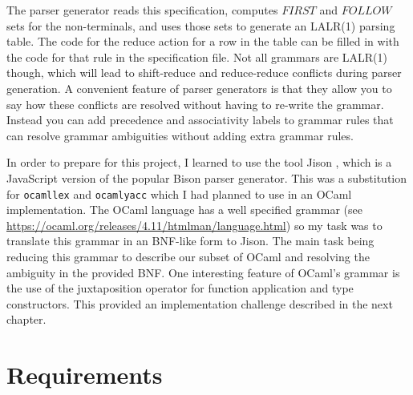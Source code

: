 \documentclass[12pt,a4paper,twoside,openright]{report}
\begin{document}
The parser generator reads this specification, computes $FIRST$ and $FOLLOW$ sets for the non-terminals, and uses those sets to generate an LALR(1) parsing table.
The code for the reduce action for a row in the table can be filled in with the code for that rule in the specification file.
Not all grammars are LALR(1) though, which will lead to shift-reduce and reduce-reduce conflicts during parser generation.
A convenient feature of parser generators is that they allow you to say how these conflicts are resolved without having to re-write the grammar.
Instead you can add precedence and associativity labels to grammar rules that can resolve grammar ambiguities without adding extra grammar rules.

In order to prepare for this project, I learned to use the tool Jison \cite{jison}, which is a JavaScript version of the popular Bison parser generator.
This was a substitution for {\tt ocamllex} and {\tt ocamlyacc} which I had planned to use in an OCaml implementation.
The OCaml language has a well specified grammar (see \url{https://ocaml.org/releases/4.11/htmlman/language.html}) so my task was to translate this grammar in an BNF-like form to Jison.
The main task being reducing this grammar to describe our subset of OCaml and resolving the ambiguity in the provided BNF.
One interesting feature of OCaml's grammar is the use of the juxtaposition operator for function application and type constructors.
This provided an implementation challenge described in the next chapter.

\section{Requirements}
\end{document}
